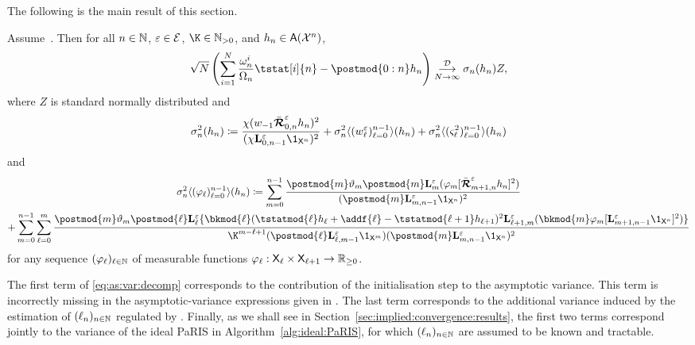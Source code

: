 The following is the main result of this section. 
\begin{theorem} \label{cor:clt:pseudo:marginal:paris}
Assume~. Then for all $n \in \mathbb{N}$, $\varepsilon \in \mathcal{E}$, $\K \in \nsetpos$, and $h_n \in \mathsf{A}(\mathcal{X}^n)$, 
$$
 \sqrt{\N} \left( \sum_{i = 1}^\N \frac{\ewght{n}{i}}{\sumwght{n}} \tstat[i]{n} - \postmod{0:n} h_n  \right) 
  \dlim \sigma_n(h_n) Z, 
$$
where $Z$ is standard normally distributed and 
\begin{equation} \label{eq:as:var:decomp}
\sigma^2_n (h_n) \eqdef \frac{\chi(\initwgtfunc \retrokmodmodnorm_{0, n} h_n)^2}{(\chi \ukmod{0, n - 1} \1_{\Xset^n})^2} + \sigma^2_n \langle (\wgtfuncmod{\ell})_{\ell = 0}^{n - 1} \rangle (h_n) + \sigma^2_n \langle (\ukestvar{\ell})_{\ell = 0}^{n - 1} \rangle (h_n) 
\end{equation}
and
\begin{multline} \label{eq:non-recursive:as:var}
\sigma^2_n \langle (\varphi_\ell)_{\ell = 0}^{n - 1} \rangle (h_n) 
\eqdef \sum_{m = 0}^{n - 1} \frac{\postmod{m} \adjfuncforward{m} \postmod{m} \ukmod{m}(\varphi_m [\retrokmodmodnorm_{m + 1, n} h_n ]^2)}{(\postmod{m} \ukmod{m, n - 1} \1_{\Xset^n})^2}\\
+ \sum_{m = 0}^{n - 1} \sum_{\ell = 0}^m \frac{\postmod{m} \adjfuncforward{m} \postmod{\ell} \ukmod{\ell} \{\bkmod{\ell}(\tstatmod{\ell} h_{\ell} + \addf{\ell} - \tstatmod{\ell + 1} h_{\ell +1})^2 \ukmod{\ell + 1, m}( \bkmod{m} \varphi_m [\ukmod{m + 1, n - 1} \1_{\Xset^n}]^2
)\}}{\K^{m - \ell + 1} (\postmod{\ell} \ukmod{\ell, m - 1} \1_{\Xset^m})(\postmod{m} \ukmod{m, n - 1} \1_{\Xset^n})^2}
\end{multline}
for any sequence $(\varphi_\ell)_{\ell \in \mathbb{N}}$ of measurable functions $\varphi_\ell : \mathsf{X}_\ell \times \mathsf{X}_{\ell + 1} \to \mathbb{R}_{\geq 0}$. 
\end{theorem}

\begin{remark}
The first term of \eqref{eq:as:var:decomp} corresponds to the contribution of the initialisation step to the asymptotic variance. This term is incorrectly missing in the asymptotic-variance expressions given in \cite[Theorem~3 and Corollary~5]{olsson:westerborn:2017}. The last term corresponds to the additional variance induced by the estimation of $(\ell_{n})_{n \in \mathbb{N}}$ regulated by . Finally, as we shall see in Section~\ref{sec:implied:convergence:results}, the first two terms correspond jointly to the variance of the ideal PaRIS in Algorithm~\ref{alg:ideal:PaRIS}, for which $(\ell_{n})_{n \in \mathbb{N}}$ are assumed to be known and tractable. 
\end{remark}

